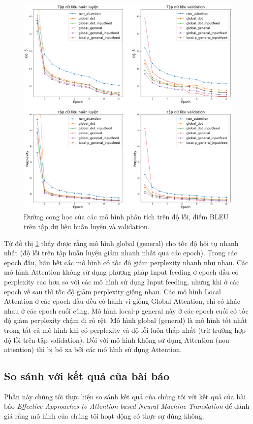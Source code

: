 \begin{figure}
	\centering
	\includegraphics[width=1.0\textwidth]{train_valid_xent_ppl_scaled.png}
	\caption[Đường cong học của các mô hình]{Đường cong học của các mô hình phân tích trên độ lỗi, điểm BLEU trên tập dữ liệu huấn luyện và validation.}
	\label{fig_learning_curve}
\end{figure}

Từ đồ thị \ref{fig_learning_curve} thấy được rằng mô hình global (general) cho tốc độ hôi tụ nhanh nhất (độ lỗi trên tập huấn luyện giảm nhanh nhất qua các epoch). Trong các epoch đầu, hầu hết các mô hình có tốc độ giảm perplexity nhanh như nhau. Các mô hình Attention không sử dụng phương pháp Input feeding ở epoch đầu có perplexity cao hơn so với các mô hình sử dụng Input feeding, nhưng khi ở các epoch về sau thì tốc độ giảm perplexity giống nhau. Các mô hình Local Attention ở các epoch đầu đều có hành vi giống Global Attention, chỉ có khác nhau ở các epoch cuối cùng. Mô hình local-p general này ở các epoch cuối có tốc độ giảm perplexity chậm đi rõ rệt. Mô hình global (general) là mô hình tốt nhất trong tất cả mô hình khi có perplexity và độ lỗi luôn thấp nhất (trừ trường hợp độ lỗi trên tập validation). Đối với mô hình không sử dụng Attention (non-attention) thì bị bỏ xa bởi các mô hình sử dụng Attention.

\subsection{So sánh với kết quả của bài báo}
Phần này chúng tôi thực hiện so sánh kết quả của chúng tôi với kết quả của bài báo \textit{Effective Approaches to Attention-based Neural Machine Translation} \cite{attentionThangLuong2015} để đánh giá rằng mô hình của chúng tôi hoạt động có thực sự đúng không.

